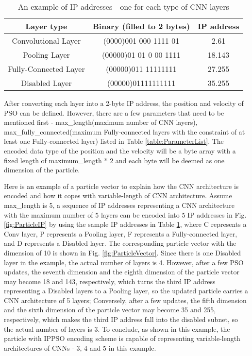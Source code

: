 \documentclass[conference]{IEEEtran}
\begin{document}
\begin{table}[!t]
	\renewcommand{\arraystretch}{1.3}
	\caption{An example of IP addresses - one for each type of CNN layers}
	\label{table:IPExample}
	\centering
	\begin{tabular}{|c|c|c|}
		\hline
		Layer type & Binary (filled to 2 bytes) & IP address\\
		\hline
		Convolutional Layer & (0000)001 000 1111 01 & 2.61\\
		\hline
		Pooling Layer & (00000)01 01 0 00 1111 & 18.143\\
		\hline
		Fully-Connected Layer & (00000)011 11111111 & 27.255\\
		\hline
		Disabled Layer & (00000)01111111111 & 35.255\\
		\hline
	\end{tabular}
\end{table}


After converting each layer into a 2-byte IP address, the position and velocity of PSO can be defined. However, there are a few parameters that need to be mentioned first - max\_length(maximum number of CNN layers), max\_fully\_connected(maximum Fully-connected layers with the constraint of at least one Fully-connected layer) listed in Table \ref{table:ParameterList}. The encoded data type of the position and the velocity will be a byte array with a fixed length of maximum\_length * 2 and each byte will be deemed as one dimension of the particle.


Here is an example of a particle vector to explain how the CNN architecture is encoded and how it copes with variable-length of CNN architecture. Assume max\_length is 5, a sequence of IP addresses representing a CNN architecture with the maximum number of 5 layers can be encoded into 5 IP addresses in Fig. \ref{fig:ParticleIP} by using the sample IP addresses in Table \ref{table:IPExample}, where C represents a Conv layer, P represents a Pooling layer, F represents a Fully-connected layer, and D represents a Disabled layer. The corresponding particle vector with the dimension of 10 is shown in Fig. \ref{fig:ParticleVector}. Since there is one Disabled layer in the example, the actual number of layers is 4. However, after a few PSO updates, the seventh dimension and the eighth dimension of the particle vector may become 18 and 143, respectively, which turns the third IP address representing a Disabled layers to a Pooling layer, so the updated particle carries a CNN architecture of 5 layers; Conversely, after a few updates, the fifth dimension and the sixth dimension of the particle vector may become 35 and 255, respectively, which makes the third IP address fall into the disabled subnet, so the actual number of layers is 3. To conclude, as shown in this example, the particle with IPPSO encoding scheme is capable of representing variable-length architectures of CNNs - 3, 4 and 5 in this example.
\end{document}
